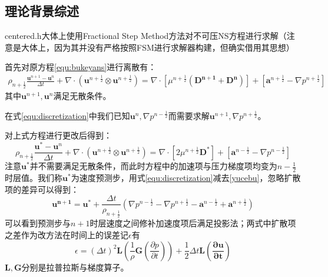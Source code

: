 \documentclass[lang=cn,11pt,a4paper]{elegantpaper}
\begin{document}
\subsection{理论背景综述}
centered.h大体上使用Fractional Step Method方法对不可压NS方程进行求解\cite{kim1985application}（注意是大体上，因为其并没有严格按照FSM进行求解器构建，但确实借用其思想）\par
首先对原方程\ref{equ:bukeyans}进行离散有：
\begin{equation}\label{equ:discretization}
        \begin{aligned}
        \rho_{n+\frac{1}{2}}\frac{\mathbf{u}^{n+1} - \mathbf{u}^{n}}{\Delta t}+\nabla\cdot(\mathbf{u}^{n+\frac{1}{2}}\otimes\mathbf{u}^{n+\frac{1}{2}})=  \nabla \cdot [\mu^{n+\frac{1}{2}}(\mathbf{D^{n+1}}+\mathbf{D^n})]+ [\mathbf{a}^{n+\frac{1}{2}}-\nabla p^{n+\frac{1}{2}}]
    \end{aligned}
\end{equation}
其中$\mathbf{u}^{n+1},\mathbf{u}^{n}$满足无散条件。\par
在式\ref{equ:discretization}中我们已知$\mathbf{u}^n,\nabla p^{n-\frac{1}{2}}$而需要求解$\mathbf{u}^{n+1},\nabla p^{n+\frac{1}{2}}$。\par
对上式方程进行更改后得到：
\begin{equation}\label{yucebu}
    \rho_{n+\frac{1}{2}}\frac{\mathbf{u}^* - \mathbf{u}^{n}}{\Delta t}+\nabla\cdot(\mathbf{u}^{n+\frac{1}{2}}\otimes\mathbf{u}^{n+\frac{1}{2}})= \nabla \cdot [2\mu^{n+\frac{1}{2}}\mathbf{D^*}]+[\mathbf{a}^{n-\frac{1}{2}}-\nabla p^{n-\frac{1}{2}}]
\end{equation}
注意$\mathbf{u^*}$并不需要满足无散条件，而此时方程中的加速项与压力梯度项均变为$n-\frac{1}{2}$时层值。我们称$\mathbf{u^*}$为速度预测步，用式\ref{equ:discretization}减去\ref{yucebu}，忽略扩散项的差异可以得到：
\begin{equation}\label{equ:poisson}
        \mathbf{u^{n+1}} = \mathbf{u^*}+\frac{\Delta t}{\rho_{n+\frac{1}{2}}}(\nabla p^{n-\frac{1}{2}}-\nabla p^{n+\frac{1}{2}}-\mathbf{a}^{n-\frac{1}{2}}+\mathbf{a}^{n+\frac{1}{2}})
\end{equation}
可以看到预测步与$n+1$时层速度之间修补加速度项后满足投影法；两式中扩散项之差作为改方法在时间上的误差记$\epsilon$有
\begin{equation}
        \epsilon = (\Delta t)^2\mathbf{L}(\frac{1}{\rho}\mathbf{G}(\frac{\partial p}{\partial t}))+\frac{1}{2}\Delta t\mathbf{L(\frac{\partial \mathbf{u}}{\partial t})}
\end{equation}
$\mathbf{L},\mathbf{G}$分别是拉普拉斯与梯度算子。\par
\end{document}
